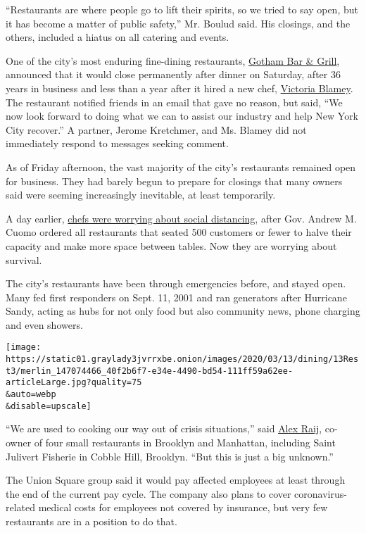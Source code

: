 ``Restaurants are where people go to lift their spirits, so we tried to
say open, but it has become a matter of public safety,'' Mr. Boulud
said. His closings, and the others, included a hiatus on all catering
and events.

One of the city's most enduring fine-dining restaurants,
\href{https://www.nytimes3xbfgragh.onion/2019/11/19/dining/gotham-bar-and-grill-review-pete-wells.html}{Gotham
Bar \& Grill}, announced that it would close permanently after dinner on
Saturday, after 36 years in business and less than a year after it hired
a new chef,
\href{https://www.nytimes3xbfgragh.onion/2019/07/23/dining/gotham-bar-and-grill-chef-victoria-blamey.html}{Victoria
Blamey}. The restaurant notified friends in an email that gave no
reason, but said, ``We now look forward to doing what we can to assist
our industry and help New York City recover.'' A partner, Jerome
Kretchmer, and Ms. Blamey did not immediately respond to messages
seeking comment.

As of Friday afternoon, the vast majority of the city's restaurants
remained open for business. They had barely begun to prepare for
closings that many owners said were seeming increasingly inevitable, at
least temporarily.

A day earlier,
\href{https://www.nytimes3xbfgragh.onion/2020/03/12/dining/restaurants-coronavirus.html}{chefs
were worrying about social distancing}, after Gov. Andrew M. Cuomo
ordered all restaurants that seated 500 customers or fewer to halve
their capacity and make more space between tables. Now they are worrying
about survival.

The city's restaurants have been through emergencies before, and stayed
open. Many fed first responders on Sept. 11, 2001 and ran generators
after Hurricane Sandy, acting as hubs for not only food but also
community news, phone charging and even showers.

\texttt{[image: https://static01.graylady3jvrrxbe.onion/images/2020/03/13/dining/13Rest3/merlin\_147074466\_40f2b6f7-e34e-4490-bd54-111ff59a62ee-articleLarge.jpg?quality=75\\\&auto=webp\\\&disable=upscale]}

``We are used to cooking our way out of crisis situations,'' said
\href{https://www.nytimes3xbfgragh.onion/2018/11/27/dining/saint-julivert-fisherie-review.html}{Alex
Raij}, co-owner of four small restaurants in Brooklyn and Manhattan,
including Saint Julivert Fisherie in Cobble Hill, Brooklyn. ``But this
is just a big unknown.''

The Union Square group said it would pay affected employees at least
through the end of the current pay cycle. The company also plans to
cover coronavirus-related medical costs for employees not covered by
insurance, but very few restaurants are in a position to do that.

